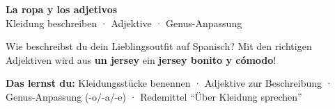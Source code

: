 \documentclass[11pt, a4paper]{article}
\newcommand{\seriftext}[1]{{\fontfamily{ppl}\selectfont #1}}
\newcommand{\es}[1]{\seriftext{\textbf{#1}}}
\begin{document}
\begin{center}
    {\LARGE\bfseries La ropa y los adjetivos}\\[3pt]
    {\small Kleidung beschreiben · Adjektive · Genus-Anpassung}
\end{center}

\vspace{4pt}

Wie beschreibst du dein Lieblingsoutfit auf Spanisch?
Mit den richtigen Adjektiven wird aus \es{un jersey} ein \es{jersey bonito y cómodo}!

\begin{lernzielbox}
\textbf{Das lernst du:}\quad
Kleidungsstücke benennen · Adjektive zur Beschreibung · Genus-Anpassung (-o/-a/-e) · Redemittel ``Über Kleidung sprechen''
\end{lernzielbox}

\end{document}
